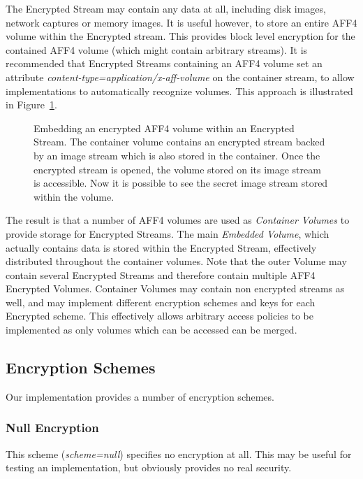 \documentclass[10pt, conference]{IEEEtran}
\begin{document}
The Encrypted Stream may contain any data at all, including disk
images, network captures or memory images. It is useful however, to
store an entire AFF4 volume within the Encrypted stream. This provides
block level encryption for the contained AFF4 volume (which might
contain arbitrary streams). It is recommended that Encrypted Streams
containing an AFF4 volume set an attribute
\emph{content-type=application/x-aff-volume} on the container stream,
to allow implementations to automatically recognize volumes. This
approach is illustrated in Figure~\ref{crypted_fif}.

\begin{figure}[tb]
  \begin{center}
  \mbox{\columnwidth {}}

  \caption{Embedding an encrypted AFF4 volume within an Encrypted
  Stream. The container volume contains an encrypted stream backed by
  an image stream which is also stored in the container. Once the
  encrypted stream is opened, the volume stored on its image stream is
  accessible. Now it is possible to see the secret image stream stored
  within the volume.}

  \label{crypted_fif}
  \end{center}
\end{figure}

The result is that a number of AFF4 volumes are used as {\em Container
Volumes} to provide storage for Encrypted Streams. The main {\em
Embedded Volume}, which actually contains data is stored within the
Encrypted Stream, effectively distributed throughout the container
volumes. Note that the outer Volume may contain several Encrypted
Streams and therefore contain multiple AFF4 Encrypted 
Volumes. Container Volumes may contain non encrypted streams as well,
and may implement different encryption schemes and keys for each
Encrypted scheme. This effectively allows arbitrary access policies to
be implemented as only volumes which can be accessed can be merged.

\subsection{Encryption Schemes}
Our implementation provides a number of encryption schemes.

\subsubsection{Null Encryption}
This scheme ({\em scheme=null}) specifies no encryption at all. This
may be useful for testing an implementation, but obviously provides
no real security.
\end{document}
